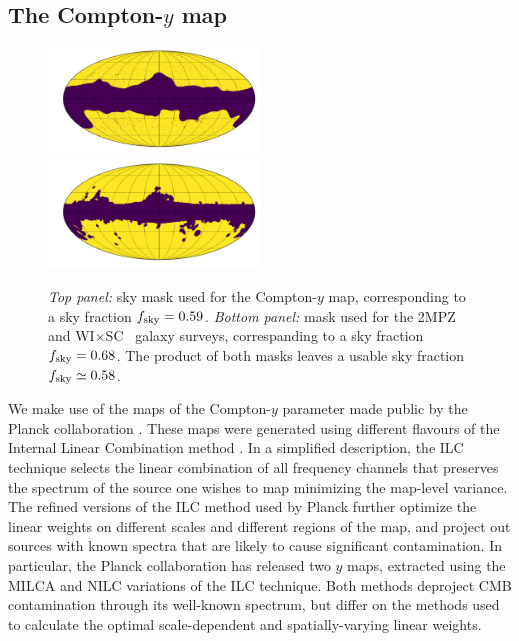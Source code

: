 \documentclass[useAMS,usenatbib]{mn2e}
\newcommand{\wisc}{WI$\times$SC}
\begin{document}
  \subsection{The Compton-$y$ map}\label{ssec:data.y}
    \begin{figure}
      \centering
      \includegraphics[width=0.5\textwidth]{mask_y.pdf}
      \includegraphics[width=0.5\textwidth]{mask_g.pdf}
      \caption{{\sl Top panel:} sky mask used for the Compton-$y$ map, corresponding to a sky fraction $f_{\rm sky}=0.59$. {\sl Bottom panel:} mask used for the 2MPZ and \wisc~ galaxy surveys, correspanding to a sky fraction $f_{\rm sky}=0.68$. The product of both masks leaves a usable sky fraction $f_{\rm sky}\simeq0.58$.
      }
      \label{fig:msk}
    \end{figure}
    We make use of the maps of the Compton-$y$ parameter made public by the Planck collaboration \citep{2016A&A...594A..22P}. These maps were generated using different flavours of the Internal Linear Combination method \citep{2004ApJ...612..633E,2008arXiv0811.4277V}. In a simplified description, the ILC technique selects the linear combination of all frequency channels that preserves the spectrum of the source one wishes to map minimizing the map-level variance. The refined versions of the ILC method used by Planck further optimize the linear weights on different scales and different regions of the map, and project out sources with known spectra that are likely to cause significant contamination. In particular, the Planck collaboration has released two $y$ maps, extracted using the MILCA \citep{2013A&A...558A.118H} and NILC \citep{2011MNRAS.410.2481R} variations of the ILC technique. Both methods deproject CMB contamination through its well-known spectrum, but differ on the methods used to calculate the optimal scale-dependent and spatially-varying linear weights.
    
\end{document}
